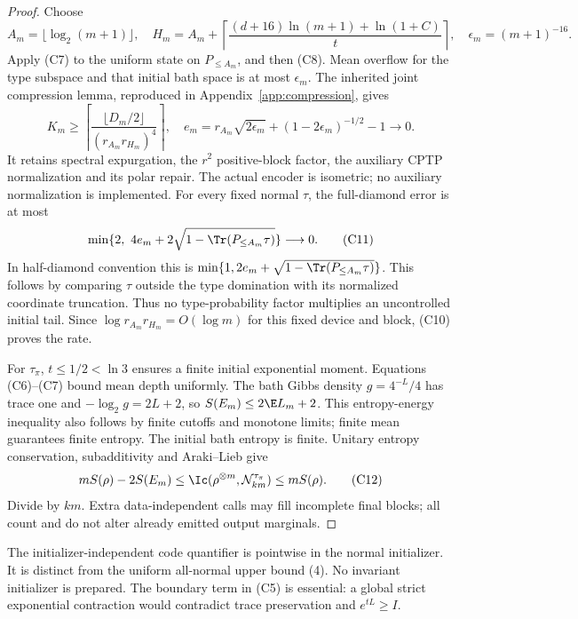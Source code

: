 \begin{proof}
Choose
\[
 A_m=\lfloor\log_2(m+1)\rfloor,\quad
 H_m=A_m+\left\lceil
 \frac{(d+16)\ln(m+1)+\ln(1+C)}t\right\rceil,\quad
 \epsilon_m=(m+1)^{-16}.
 \tag{C9}
\]
Apply (C7) to the uniform state on $P_{\le A_m}$, and then (C8).
Mean overflow for the type subspace and that initial bath space is at
most $\epsilon_m$. The inherited joint compression lemma, reproduced
in Appendix~\ref{app:compression}, gives
\[
 K_m\ge\left\lceil
 \frac{\lfloor D_m/2\rfloor}{(r_{A_m}r_{H_m})^4}
 \right\rceil,\quad
 e_m=r_{A_m}\sqrt{2\epsilon_m}+(1-2\epsilon_m)^{-1/2}-1\to0.
 \tag{C10}
\]
It retains spectral expurgation, the $r^2$ positive-block factor,
the auxiliary CPTP normalization and its polar repair.
The actual encoder is isometric; no auxiliary normalization is implemented.
For every fixed normal $\tau$, the full-diamond error is at most
\[
 \min\{2,\ 4e_m+2\sqrt{1-\Tr(P_{\le A_m}\tau)}\}\longrightarrow0.
 \tag{C11}
\]
In half-diamond convention this is
$\min\{1,2e_m+\sqrt{1-\Tr(P_{\le A_m}\tau)}\}$.
This follows by comparing $\tau$ outside the type domination with its
normalized coordinate truncation. Thus no type-probability factor multiplies
an uncontrolled initial tail. Since $\log r_{A_m}r_{H_m}=O(\log m)$
for this fixed device and block, (C10) proves the rate.

For $\tau_\pi$, $t\le1/2<\ln3$ ensures a finite initial exponential
moment. Equations (C6)--(C7) bound mean depth uniformly. The bath Gibbs
density $g=4^{-L}/4$ has trace one and
$-\log_2g=2L+2$, so $S(E_m)\le2\E L_m+2$.
This entropy-energy inequality also follows by finite cutoffs and monotone
limits; finite mean guarantees finite entropy. The initial bath entropy
is finite. Unitary entropy conservation, subadditivity and Araki--Lieb give
\[
 mS(\rho)-2S(E_m)\le\Ic(\rho^{\otimes m},\mathcal N_{km}^{\tau_\pi})
 \le mS(\rho).
 \tag{C12}
\]
Divide by $km$. Extra data-independent calls may fill incomplete final
blocks; all count and do not alter already emitted output marginals.
\end{proof}

The initializer-independent code quantifier is pointwise in the normal initializer.
It is distinct from the uniform all-normal upper bound (4).
No invariant initializer is prepared. The boundary term in (C5) is essential:
a global strict exponential contraction would contradict trace preservation
and $e^{tL}\ge I$.

